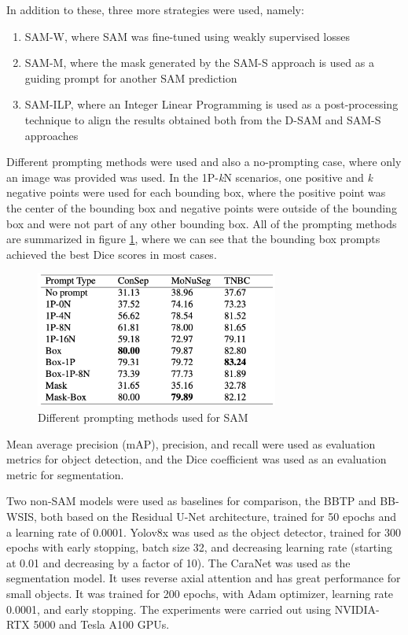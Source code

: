 In addition to these, three more strategies were used, namely:

\begin{enumerate}
    \item SAM-W, where SAM was fine-tuned using weakly supervised losses
    \item SAM-M, where the mask generated by the SAM-S approach is used as a guiding prompt for another SAM prediction
    \item SAM-ILP, where an Integer Linear Programming is used as a post-processing technique to align the results obtained both from the D-SAM and SAM-S approaches
\end{enumerate}

Different prompting methods were used and also a no-prompting case, where only an image was provided was used. In the 1P-\textit{k}N scenarios, one positive and \textit{k} negative points were used for each bounding box, where the positive point was the center of the bounding box and negative points were outside of the bounding box and were not part of any other bounding box. All of the prompting methods are summarized in figure \ref{fig:rw-sam-prompting}, where we can see that the bounding box prompts achieved the best Dice scores in most cases.

\begin{figure}[H]
    \begin{centering}
    \includegraphics[width=8cm]{assets/images/rw-table-prompting.png}
    \par\end{centering}
    \caption{Different prompting methods used for SAM}
    \label{fig:rw-sam-prompting}
\end{figure}

Mean average precision (mAP), precision, and recall were used as evaluation metrics for object detection, and the Dice coefficient was used as an evaluation metric for segmentation.

Two non-SAM models were used as baselines for comparison, the BBTP and BB-WSIS, both based on the Residual U-Net architecture, trained for 50 epochs and a learning rate of 0.0001. Yolov8x was used as the object detector, trained for 300 epochs with early stopping, batch size 32, and decreasing learning rate (starting at 0.01 and decreasing by a factor of 10). The CaraNet was used as the segmentation model. It uses reverse axial attention and has great performance for small objects. It was trained for 200 epochs, with Adam optimizer, learning rate 0.0001, and early stopping. The experiments were carried out using NVIDIA-RTX 5000 and Tesla A100 GPUs.


